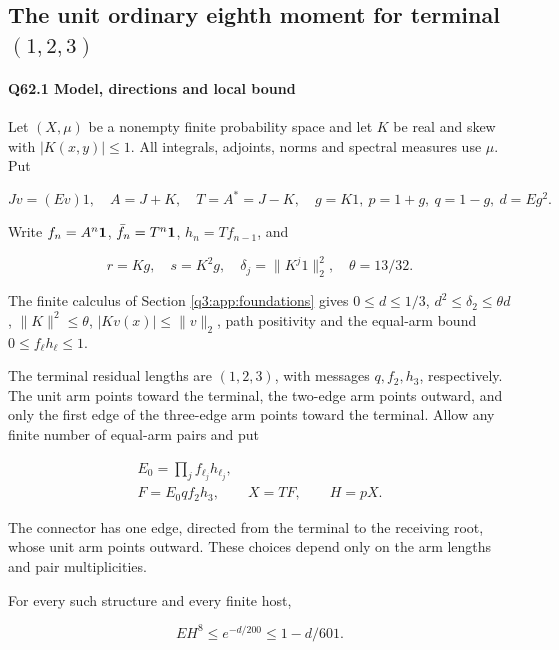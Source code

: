 \subsection{The unit ordinary eighth moment for terminal $(1,\allowbreak 2,\allowbreak 3)$}\label{proof:Q5-C062}
\paragraph{Q62.1 Model, directions and local bound}

Let $(X,\allowbreak  \mu)$ be a nonempty finite probability space and let $K$ be real and skew with $|K(x,\allowbreak  y)|\le\allowbreak 1$.
All integrals, adjoints, norms and spectral measures use $\mu$. Put

\[
Jv=(Ev)1,\quad A=J+K,\quad T=A^*=J-K,
\quad g=K1,\ p=1+g,\ q=1-g,\ d=Eg^2.
\]

Write $f_n=\allowbreak A^n\mathbf1$, $\bar f_n=\allowbreak T^n\mathbf1$, $h_n=\allowbreak Tf_{n-1}$, and

\[
r=Kg,\quad s=K^2g,\quad \delta_j=\|K^j1\|_2^2,
\quad \theta=13/32.
\]

The finite calculus of Section \ref{q3:app:foundations} gives
$0\le\allowbreak  d\le\allowbreak 1/3$, $d^2\le\allowbreak  \delta_2\le\allowbreak \theta d$, $\|K\|^2\le\allowbreak \theta$,
$|Kv(x)|\le\allowbreak \|v\|_2$, path positivity and the equal-arm bound
$0\le\allowbreak  f_\ell h_\ell\le\allowbreak 1$.


The terminal residual lengths are $(1,\allowbreak  2,\allowbreak  3)$, with messages $q,\allowbreak  f_2,\allowbreak  h_3$, respectively.
The unit arm points toward the terminal, the two-edge arm points outward, and only the first edge of the three-edge arm points toward the terminal.
Allow any finite number of equal-arm pairs and put

\[
\begin{gathered}
E_0=\prod_j f_{\ell_j}h_{\ell_j},\qquad\\
F=E_0q f_2h_3,\qquad X=TF,\qquad H=pX.
\end{gathered}\tag{Q62.1.1}\label{eq:Q62:Q62:1:1}
\]

The connector has one edge, directed from the terminal to the receiving root, whose unit arm points outward.
These choices depend only on the arm lengths and pair multiplicities.

For every such structure and every finite host,

\[
\boxed{EH^8\le e^{-d/200}\le1-d/601.}
\tag{Q62.1.2}\label{eq:Q62:Q62:1:2}
\]

